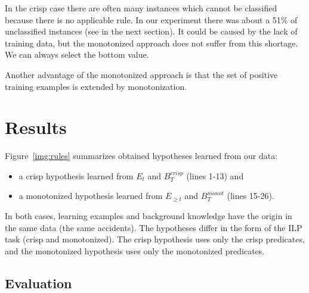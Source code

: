 In the crisp case there are often many instances which cannot be classified because there is no applicable rule. In our experiment there was about a 51\%
of unclassified instances (see in the next section). It could be caused by the lack of training data, but the monotonized approach does not suffer from this shortage. We can always select the bottom value.

Another advantage of the monotonized approach is that the set of positive training examples is extended by monotonization. 





\section{Results} \label{sec:results}

Figure~\ref{img:rules} summarizes obtained hypotheses learned from our data: 
\begin{itemize}
	\item a crisp hypothesis learned from $E_t$ and $B^{crisp}_{T}$ (lines 1-13) and
	\item a monotonized hypothesis learned from $E_{\ge t}$ and ${B}^{monot}_T$ (lines 15-26).
\end{itemize}


In both cases, learning examples and background knowledge have the origin in the same data (the same accidents). The hypotheses differ in the form of the ILP task (crisp and monotonized). The crisp hypothesis uses only the crisp predicates, and the monotonized hypothesis uses only the monotonized predicates.


\subsection{Evaluation} \label{sec:ch80_eval}

